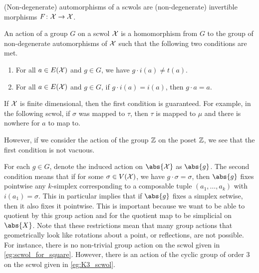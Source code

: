 (Non-degenerate) automorphisms of a scwols are (non-degenerate) invertible morphisms $F \colon \mathcal{X} \to \mathcal{X}$.

\begin{definition}
	An action of a group $G$ on a scwol $\mathcal{X}$ is a homomorphism from $G$ to the group of non-degenerate automorphisms of $\mathcal{X}$ such that the following two conditions are met.
	\begin{enumerate}
		\item For all $a \in E(\mathcal{X})$ and $g \in G$, we have  $g \cdot i(a) \neq t(a)$.
		\item For all $a \in E(\mathcal{X})$ and $g \in G$, if  $g\cdot i(a)=i(a)$, then  $g\cdot a = a$.
	\end{enumerate}
	\label{def:action_of_groups_on_scwols}
\end{definition}

If $\mathcal{X}$ is finite dimensional, then the first condition is guaranteed.
For example, in the following scwol, if $\sigma$ was mapped to  $\tau$, then $\tau$ is mapped to $\mu$ and there is nowhere for $a$ to map to.

\begin{center}
\end{center}

However, if we consider the action of the group $\mathbb{Z}$ on the poset $\mathbb{Z}$, we see that  the first condition is not vacuous.

For each $g \in G$, denote the induced action on  $\abs{\calx}$ as $\abs{g}$.
The second condition means that if for some $\sigma \in V(\mathcal{X})$, we have $g \cdot \sigma = \sigma$, then $\abs{g}$ fixes pointwise any $k$-simplex corresponding to a composable tuple $(a_1,  \ldots, a_k)$ with $i(a_1)=\sigma$.
This in particular implies that if $\abs{g}$ fixes a simplex setwise, then it also fixes it pointwise.
This is important because we want to be able to quotient by this group action and for the quotient map to be simplicial on $\abs{X}$.
Note that these restrictions mean that many group actions that geometrically look like rotations about a point, or reflections, are not possible.
For instance, there is no non-trivial group action on the scwol given in \cref{eg:scwol_for_square}.
However, there is an action of the cyclic group of order 3 on the scwol given in \cref{eg:K3_scwol}.

